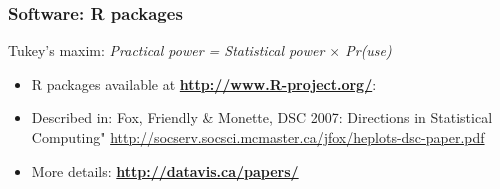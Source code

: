 \renewcommand{\FileName}{software}

\begin{frame}
  \frametitle{Software: R packages}
\begin{block}{\Large Tukey's maxim:}
 \hfill\emph{\Large Practical power = Statistical power $\times$ Pr(use)}
\end{block}

\vspace*{2ex}
\begin{itemize}
  
 \item R packages available at \textbf{\url{http://www.R-project.org/}}:
\item Described in: Fox, Friendly \& Monette, DSC 2007: Directions in Statistical Computing"
{\small\url{http://socserv.socsci.mcmaster.ca/jfox/heplots-dsc-paper.pdf}}
\item More details: \textbf{\url{http://datavis.ca/papers/}}
\end{itemize}
\end{frame}

